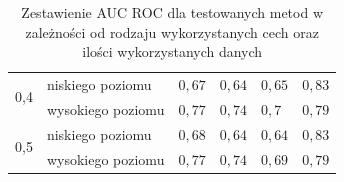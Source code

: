 \begin{table}[]
\begin{tabular}{|l|l|l|l|l|l|}
\multirow{2}{*}{0,4}   & niskiego poziomu  & $ 0,67 $ & $ 0,64 $ & $ 0,65 $ &$ 0,83 $ \\ \cline{2-6} 
                       & wysokiego poziomu &  $ 0,77 $ & $ 0,74 $ & $ 0,7 $ &$ 0,79 $ \\ \hline
                       
\multirow{2}{*}{0,5}   & niskiego poziomu  &  $ 0,68 $ & $ 0,64 $ & $ 0,64 $ &$ 0,83 $ \\ \cline{2-6} 
                       & wysokiego poziomu &  $ 0,77 $ & $ 0,74 $ & $ 0,69 $ &$ 0,79 $ \\ \hline
\end{tabular}

\caption{Zestawienie AUC ROC dla testowanych metod w zależności od rodzaju wykorzystanych cech oraz ilości wykorzystanych danych}
\label{table:higgstable}

\end{table}


